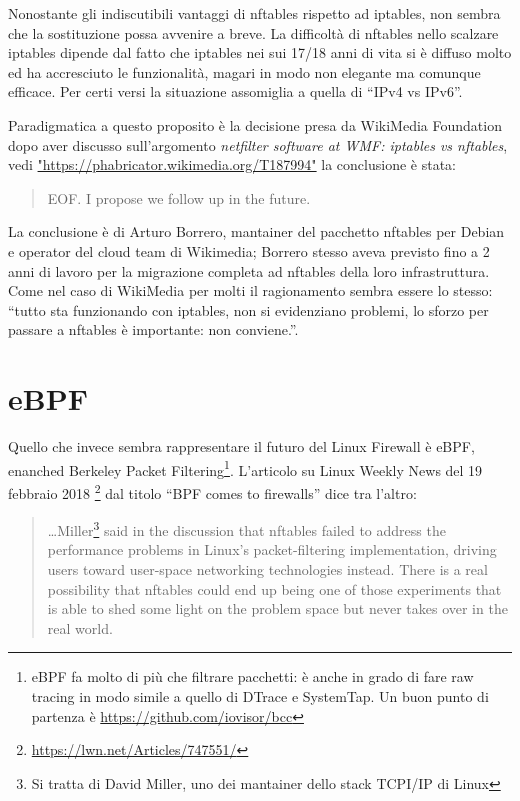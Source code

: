 Nonostante gli indiscutibili vantaggi di nftables rispetto ad iptables, non
sembra che la sostituzione possa avvenire a breve.  La difficolt\`a di nftables
nello scalzare iptables dipende dal fatto che iptables nei sui 17/18 anni di
vita si \`e diffuso molto ed ha accresciuto le funzionalit\`a, magari in modo
non elegante ma comunque efficace. Per certi versi la situazione assomiglia a
quella di ``IPv4 vs IPv6''.

Paradigmatica a questo proposito \`e la decisione presa da WikiMedia Foundation
dopo aver discusso sull'argomento {\em netfilter software at WMF: iptables vs
nftables}, vedi  \url{"https://phabricator.wikimedia.org/T187994"}
la conclusione \`e stata:
\begin{quote}
    EOF. I propose we follow up in the future.
\end{quote}
La conclusione \`e di Arturo Borrero, mantainer del pacchetto nftables per
Debian e operator del cloud team di Wikimedia; Borrero stesso aveva previsto fino a 2
anni di lavoro per la migrazione completa ad nftables della loro
infrastruttura.
Come nel caso di WikiMedia per molti il ragionamento sembra essere lo stesso: ``tutto sta
funzionando con iptables, non si evidenziano problemi, lo sforzo per passare a
nftables \`e importante: non conviene.''.

\section{eBPF}

Quello che invece sembra rappresentare il futuro del Linux Firewall \`e eBPF,
enanched Berkeley Packet Filtering\footnote{eBPF fa molto di pi\`u che filtrare
pacchetti: \`e anche in grado di fare raw tracing in modo simile a quello di
DTrace e SystemTap. Un buon punto di partenza \`e
\url{https://github.com/iovisor/bcc}}.
L'articolo su Linux Weekly News del 19 febbraio 2018
\footnote{\url{https://lwn.net/Articles/747551/}} dal titolo ``BPF comes to firewalls''
dice tra l'altro:

\begin{quote}
\ldots Miller\footnote{Si tratta di David Miller, uno dei mantainer dello stack
TCPI/IP di Linux} said in the discussion that nftables failed to address the
performance problems in Linux's packet-filtering implementation, driving users
toward user-space networking technologies instead. There is a real possibility
that nftables could end up being one of those experiments that is able to shed
some light on the problem space but never takes over in the real world.
\end{quote}


